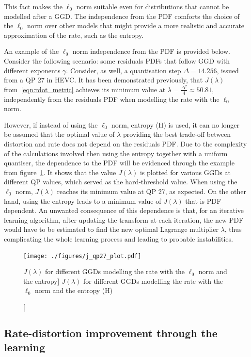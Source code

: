 \documentclass[11pt,a4paper,openright,twoside]{book}
\def\usepdfs{1} %
\numberwithin{equation}{section} %
\numberwithin{figure}{section} %
\numberwithin{table}{section} %
\begin{document}
This fact makes the $\ell_0$ norm suitable even for distributions that cannot
be modelled after a \ac{GGD}.
The independence from the \ac{PDF} comforts the choice of the $\ell_0$
norm over other models that might provide a more realistic and accurate
approximation of the rate, such as the entropy.

An example of the $\ell_0$ norm independence from the \ac{PDF} is provided
below.
Consider the following scenario: some residuals \acp{PDF} that follow \ac{GGD}
with different exponents $\gamma$.
Consider, as well, a quantisation step $\Delta=14.256$, issued from a \ac{QP}
27 in \ac{HEVC}.
It has been demonstrated previously, that $J(\lambda)$
from~\eqref{eqn:rdot_metric} achieves its minimum value at
$\lambda=\frac{\Delta^2}{4}\approx50.81$, independently from the
residuals \ac{PDF} when modelling the rate with the $\ell_0$ norm.

However, if instead of using the $\ell_0$ norm, entropy (H) is used, it can no
longer be assumed that the optimal value of $\lambda$ providing the best
trade-off between distortion and rate does not depend on the residuals
\ac{PDF}.
Due to the complexity of the calculations involved then using the
entropy together with a uniform quantiser, the dependence to the
\ac{PDF} will be evidenced through the example from
figure~\ref{fig:j_lambda_qp}.
It shows that the value $J(\lambda)$ is plotted for various \acp{GGD} at
different \ac{QP} values, which served as the hard-threshold value.
When using the $\ell_0$ norm, $J(\lambda)$ reaches its minimum value at
QP 27, as expected.
On the other hand, using the entropy leads to a minimum value of
$J(\lambda)$ that is \ac{PDF}-dependent.
An unwanted consequence of this dependence is that, for an iterative
learning algorithm, after updating the transform at each iteration, the
new \ac{PDF} would have to be estimated to find the new optimal Lagrange
multiplier $\lambda$, thus complicating the whole learning process and
leading to probable instabilities.
\begin{figure}[tp]
	\centering
	\ifthenelse{\usepdfs = 0}
	{}
	{\texttt{[image: ./figures/j\_qp27\_plot.pdf]}}
	\caption
	[$J(\lambda)$ for different \acsp{GGD} modelling the rate with
	the $\ell_0$ norm and the entropy]
	{$J(\lambda)$ for different \acsp{GGD} modelling the rate with
	the $\ell_0$ norm and the entropy (H)}
	\label{fig:j_lambda_qp}
\end{figure}

\subsection{Rate-distortion improvement through the learning}
\label{sub:rate_distortion_improvement_through_the_learning}
\end{document}
